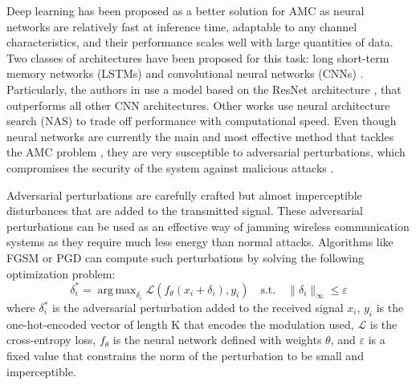 \documentclass[conference]{IEEEtran}
\newcommand{\pf}[1]{{\textcolor{orange}{PF: {#1}}}}
\newcommand{\Ls}{\mathcal{L}}
\DeclareMathOperator*{\argmax}{arg\,max}
\begin{document}
Deep learning \cite{goodfellow2016deep} has been proposed as a better solution for AMC as neural networks are relatively fast at inference time, adaptable to any channel characteristics, and their performance scales well with large quantities of data. Two classes of architectures have been proposed for this task: long short-term memory networks (LSTMs) \cite{Rajendran_Meert_Giustiniano_Lenders_Pollin_2018,Guo_Jiang_Wu_Zhou_2020} and convolutional neural networks (CNNs) \cite{OShea_Corgan_Clancy_2016,West_OShea_2017,Sadeghi_Larsson_2019}. Particularly, the authors in \cite{OShea_Roy_Clancy_2018} use a model based on the ResNet architecture \cite{Szegedy_Ioffe_Vanhoucke_Alemi_2016}, that outperforms all other CNN architectures. Other works use neural architecture search (NAS) \cite{ahmadi2008modulation,dai2019multi,perenda2021evolutionary} to trade off performance with computational speed. Even though neural networks are currently the main and most effective method that tackles the AMC problem \cite{OShea_Roy_Clancy_2018}, they are very susceptible to adversarial perturbations, which compromises the security of the system against malicious attacks  \cite{Szegedy_Zaremba_Sutskever_Bruna_Erhan_Goodfellow_Fergus_2014, moosavi2017universal,Sadeghi_Larsson_2019,Lin_Zhao_2020,Flowers_Buehrer_Headley_2019, maroto2021benefits}. 


%
Adversarial perturbations are carefully crafted but almost imperceptible disturbances that are added to the transmitted signal. These adversarial perturbations can be used as an effective way of jamming wireless communication systems as they require much less energy than normal attacks. Algorithms like FGSM \cite{Goodfellow_Shlens_Szegedy_2015} or PGD \cite{Madry_Makelov_Schmidt_Tsipras_Vladu_2019} can compute such perturbations by solving the following optimization problem:
\begin{equation}
\label{eq:adv_pert}
    \delta_i^* = \argmax_{\delta_i}\Ls(f_{\theta}(x_i + \delta_i), y_i) \quad \text{s.t.} \quad \lVert \delta_i \rVert_{\infty} \leq \varepsilon
\end{equation}
where $\delta_i^*$ is the adversarial perturbation added to the received signal $x_i$, $y_i$ is the one-hot-encoded vector of length K that encodes the modulation used, $\Ls$ is the cross-entropy loss, $f_{\theta}$ is the neural network defined with weights $\theta$, and $\varepsilon$ is a fixed value that constrains the norm of the perturbation to be small and imperceptible.
\end{document}
